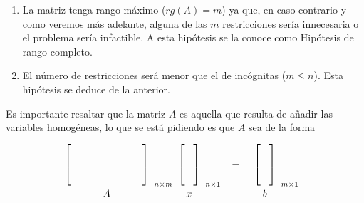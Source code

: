 \begin{enumerate}
  \item La matriz tenga rango máximo ($rg(A)=m$) ya que, en caso contrario y como veremos más adelante, alguna de las $m$ restricciones sería innecesaria o el problema sería infactible. A esta hipótesis se la conoce como Hipótesis de rango completo.
  \item El número de restricciones será menor que el de incógnitas ($m
  \le n$). Esta hipótesis se deduce de la anterior.
\end{enumerate}
Es importante resaltar que la matriz $A$ es aquella que resulta de
añadir las variables homogéneas, lo que se está pidiendo es que $A$ sea de la forma
$$
\begin{blockarray}{cc}
  \begin{block}{[c]l}
    \hspace*{2.5cm} & \\
    & \\
    & \\
    & _{n\times m}\\
  \end{block}
  A & \\
\end{blockarray}
\begin{blockarray}{cc}
  \begin{block}{[c]l}
    \hspace*{0.3cm}& \\
    & \\
    & \\
    & _{n\times 1}\\
  \end{block}
  x & \\
\end{blockarray}
\begin{array}{c}
  =\\ \\ \\
\end{array}\quad
\begin{blockarray}{cc}
  \begin{block}{[c]l}
    \hspace*{0.3cm}& \\
    & \\
    & \\
    & _{m\times 1}\\
  \end{block}
  b & \\
\end{blockarray}
$$

